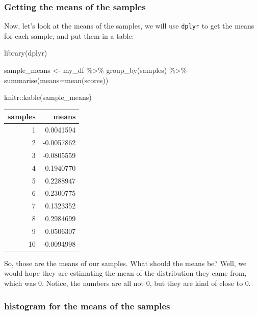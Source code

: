 \documentclass[
]{book}
\newenvironment{Shaded}{\begin{snugshade}}{\end{snugshade}}
\newcommand{\AttributeTok}[1]{\textcolor[rgb]{0.77,0.63,0.00}{#1}}
\newcommand{\FunctionTok}[1]{\textcolor[rgb]{0.00,0.00,0.00}{#1}}
\newcommand{\NormalTok}[1]{#1}
\newcommand{\OtherTok}[1]{\textcolor[rgb]{0.56,0.35,0.01}{#1}}
\newcommand{\SpecialCharTok}[1]{\textcolor[rgb]{0.00,0.00,0.00}{#1}}
\begin{document}
\hypertarget{getting-the-means-of-the-samples}{%
\subsubsection{Getting the means of the samples}\label{getting-the-means-of-the-samples}}

Now, let's look at the means of the samples, we will use \texttt{dplyr} to get the means for each sample, and put them in a table:

\begin{Shaded}
\begin{Highlighting}[]
\FunctionTok{library}\NormalTok{(dplyr)}

\NormalTok{sample\_means }\OtherTok{\textless{}{-}}\NormalTok{ my\_df }\SpecialCharTok{\%\textgreater{}\%}
                \FunctionTok{group\_by}\NormalTok{(samples) }\SpecialCharTok{\%\textgreater{}\%}
                \FunctionTok{summarise}\NormalTok{(}\AttributeTok{means=}\FunctionTok{mean}\NormalTok{(scores))}

\NormalTok{knitr}\SpecialCharTok{::}\FunctionTok{kable}\NormalTok{(sample\_means)}
\end{Highlighting}
\end{Shaded}

\begin{tabular}{r|r}
\hline
samples & means\\
\hline
1 & 0.0041594\\
\hline
2 & -0.0057862\\
\hline
3 & -0.0805559\\
\hline
4 & 0.1940770\\
\hline
5 & 0.2288947\\
\hline
6 & -0.2300775\\
\hline
7 & 0.1323352\\
\hline
8 & 0.2984699\\
\hline
9 & 0.0506307\\
\hline
10 & -0.0094998\\
\hline
\end{tabular}

So, those are the means of our samples. What should the means be? Well, we would hope they are estimating the mean of the distribution they came from, which was 0. Notice, the numbers are all not 0, but they are kind of close to 0.

\hypertarget{histogram-for-the-means-of-the-samples}{%
\subsubsection{histogram for the means of the samples}\label{histogram-for-the-means-of-the-samples}}
\end{document}
